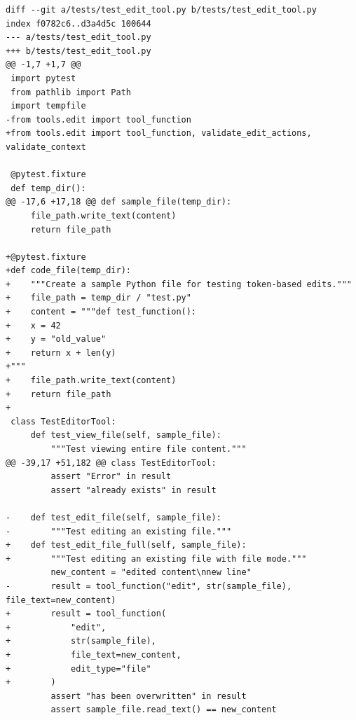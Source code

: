 \documentclass{article}
\begin{document}
\begin{lstlisting}[style=diffstyle]
diff --git a/tests/test_edit_tool.py b/tests/test_edit_tool.py
index f0782c6..d3a4d5c 100644
--- a/tests/test_edit_tool.py
+++ b/tests/test_edit_tool.py
@@ -1,7 +1,7 @@
 import pytest
 from pathlib import Path
 import tempfile
-from tools.edit import tool_function
+from tools.edit import tool_function, validate_edit_actions, validate_context
 
 @pytest.fixture
 def temp_dir():
@@ -17,6 +17,18 @@ def sample_file(temp_dir):
     file_path.write_text(content)
     return file_path
 
+@pytest.fixture
+def code_file(temp_dir):
+    """Create a sample Python file for testing token-based edits."""
+    file_path = temp_dir / "test.py"
+    content = """def test_function():
+    x = 42
+    y = "old_value"
+    return x + len(y)
+"""
+    file_path.write_text(content)
+    return file_path
+
 class TestEditorTool:
     def test_view_file(self, sample_file):
         """Test viewing entire file content."""
@@ -39,17 +51,182 @@ class TestEditorTool:
         assert "Error" in result
         assert "already exists" in result
 
-    def test_edit_file(self, sample_file):
-        """Test editing an existing file."""
+    def test_edit_file_full(self, sample_file):
+        """Test editing an existing file with file mode."""
         new_content = "edited content\nnew line"
-        result = tool_function("edit", str(sample_file), file_text=new_content)
+        result = tool_function(
+            "edit", 
+            str(sample_file), 
+            file_text=new_content, 
+            edit_type="file"
+        )
         assert "has been overwritten" in result
         assert sample_file.read_text() == new_content
 

\end{lstlisting}
\end{document}
